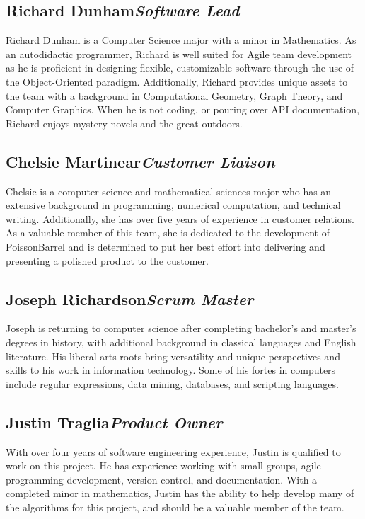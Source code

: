 \documentclass[12pt]{article}
\begin{document}
\subsection*{Richard Dunham\hfill\textit{Software Lead}}
Richard Dunham is a Computer Science major with a minor in Mathematics. As an
autodidactic programmer, Richard is well suited for Agile team development as
he is proficient in designing flexible, customizable software through the use
of the Object-Oriented paradigm. Additionally, Richard provides unique assets
to the team with a background in Computational Geometry, Graph Theory, and
Computer Graphics. When he is not coding, or pouring over API documentation,
Richard enjoys mystery novels and the great outdoors.

\subsection*{Chelsie Martinear\hfill\textit{Customer Liaison}}
Chelsie is a computer science and mathematical sciences major who has an
extensive background in programming, numerical computation, and technical
writing. Additionally, she has over five years of experience in customer
relations. As a valuable member of this team, she is dedicated to the
development of PoissonBarrel and is determined to put her best effort into
delivering and presenting a polished product to the customer. 

\subsection*{Joseph Richardson\hfill\textit{Scrum Master}}
Joseph is returning to computer science after completing bachelor's and
master's degrees in history, with additional background in classical languages
and English literature. His liberal arts roots bring versatility and unique
perspectives and skills to his work in information technology. Some of his
fortes in computers include regular expressions, data mining, databases, and
scripting languages.

\subsection*{Justin Traglia\hfill\textit{Product Owner}}
With over four years of software engineering experience, Justin is qualified to
work on this project. He has experience working with small groups, agile
programming development, version control, and documentation. With a completed
minor in mathematics, Justin has the ability to help develop many of the
algorithms for this project, and should be a valuable member of the team.
\end{document}
